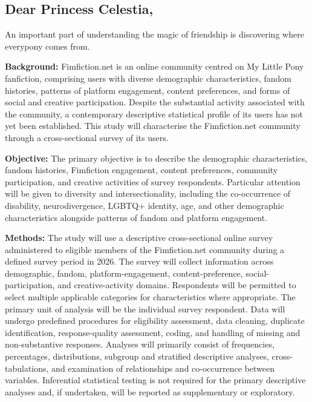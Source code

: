 \subsection*{Dear Princess Celestia,}

An important part of understanding the magic of friendship is discovering where everypony comes from.

\textbf{Background:} Fimfiction.net is an online community centred on My Little Pony fanfiction, comprising users with diverse demographic characteristics, fandom histories, patterns of platform engagement, content preferences, and forms of social and creative participation. Despite the substantial activity associated with the community, a contemporary descriptive statistical profile of its users has not yet been established. This study will characterise the Fimfiction.net community through a cross-sectional survey of its users.

\textbf{Objective:} The primary objective is to describe the demographic characteristics, fandom histories, Fimfiction engagement, content preferences, community participation, and creative activities of survey respondents. Particular attention will be given to diversity and intersectionality, including the co-occurrence of disability, neurodivergence, LGBTQ+ identity, age, and other demographic characteristics alongside patterns of fandom and platform engagement.

\textbf{Methods:} The study will use a descriptive cross-sectional online survey administered to eligible members of the Fimfiction.net community during a defined survey period in 2026. The survey will collect information across demographic, fandom, platform-engagement, content-preference, social-participation, and creative-activity domains. Respondents will be permitted to select multiple applicable categories for characteristics where appropriate. The primary unit of analysis will be the individual survey respondent. Data will undergo predefined procedures for eligibility assessment, data cleaning, duplicate identification, response-quality assessment, coding, and handling of missing and non-substantive responses. Analyses will primarily consist of frequencies, percentages, distributions, subgroup and stratified descriptive analyses, cross-tabulations, and examination of relationships and co-occurrence between variables. Inferential statistical testing is not required for the primary descriptive analyses and, if undertaken, will be reported as supplementary or exploratory.

